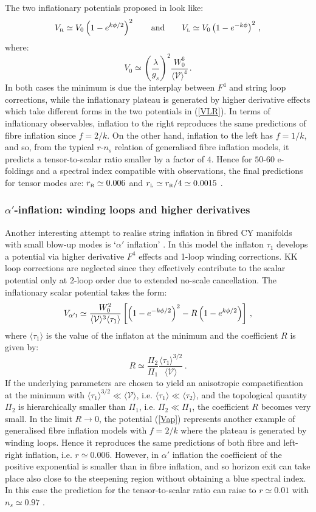 \documentclass[11pt,a4paper]{article}
\newcommand{\be}{\begin{equation}}
\newcommand{\ee}{\end{equation}}
\def\I{{\scriptscriptstyle \rm I}}
\def\R{{\scriptscriptstyle \rm R}}
\def\L{{\scriptscriptstyle \rm L}}
\newcommand\vo{{\mathcal{V}}}
\begin{document}
The two inflationary potentials proposed in \cite{Broy:2015zba} look like:
\be
V_\R \simeq V_0 \left(1 - e^{k \phi/2}\right)^2 \qquad \text{and}\qquad V_\L \simeq V_0 \left(1 - e^{- k \phi}\right)^2\,,
\label{VLR}
\ee 
where:
\be
V_0 \simeq \left(\frac{\lambda}{g_s}\right)^2 \frac{W_0^6}{\langle\vo\rangle^4} \,.
\ee 
In both cases the minimum is due the interplay between $F^4$ and string loop corrections, while the inflationary plateau is generated by higher derivative effects which take different forms in the two potentials in (\ref{VLR}). In terms of inflationary observables, inflation to the right reproduces the same predictions of fibre inflation since $f=2/k$. On the other hand, inflation to the left has $f=1/k$, and so, from the typical $r$-$n_s$ relation of generalised fibre inflation models, it predicts a tensor-to-scalar ratio smaller by a factor of $4$. Hence for $50$-$60$ e-foldings and a spectral index compatible with observations, the final predictions for tensor modes are: $r_\R \simeq 0.006$ and $r_\L \simeq r_\R/4 \simeq 0.0015$ \cite{Broy:2015zba}.

\subsubsection*{$\alpha'$-inflation: winding loops and higher derivatives}

Another interesting attempt to realise string inflation in fibred CY manifolds with small blow-up modes is `$\alpha'$ inflation' \cite{Cicoli:2016chb}. In this model the inflaton $\tau_1$ develops a potential via higher derivative $F^4$ effects and 1-loop winding corrections. KK loop corrections are neglected since they effectively contribute to the scalar potential only at 2-loop order due to extended no-scale cancellation. The inflationary scalar potential takes the form:
\be
V_{\alpha'\I} \simeq \frac{W_0^2}{\langle \vo \rangle^3 \langle\tau_1\rangle} \left[\left(1 - e^{- k \phi/2}\right)^2  
-R \left(1- e^{k \phi/2} \right)\right]\,,
\label{Vap}
\ee 
where $\langle\tau_1\rangle$ is the value of the inflaton at the minimum and the coefficient $R$ is given by:
\be 
R \simeq \frac{\Pi_2}{\Pi_1} \frac{\langle\tau_1\rangle^{3/2}}{\langle \vo \rangle}\,.
\ee 
If the underlying parameters are chosen to yield an anisotropic compactification at the minimum with $\langle \tau_1\rangle^{3/2}\ll \langle\vo\rangle$, i.e. $\langle \tau_1\rangle\ll \langle\tau_2\rangle$, and the topological quantity $\Pi_2$ is hierarchically smaller than $\Pi_1$, i.e. $\Pi_2\ll \Pi_1$, the coefficient $R$ becomes very small. In the limit $R\to 0$, the potential (\ref{Vap}) represents another example of generalised fibre inflation models with $f=2/k$ where the plateau is generated by winding loops. Hence it reproduces the same predictions of both fibre and left-right inflation, i.e. $r\simeq 0.006$. However, in $\alpha'$ inflation the coefficient of the positive exponential is smaller than in fibre inflation, and so horizon exit can take place also close to the steepening region without obtaining a blue spectral index. In this case the prediction for the tensor-to-scalar ratio can raise to $r \simeq 0.01$ with $n_s \simeq 0.97$ \cite{Cicoli:2016chb}.
\end{document}
